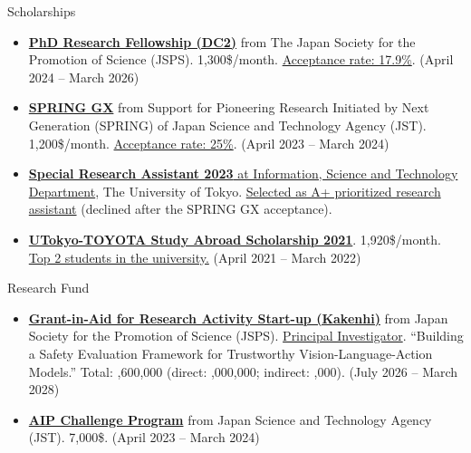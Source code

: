 \documentclass[]{mcdowellcv}
\begin{document}

\begin{cvsection}{Scholarships}
    \label{cvsec:scholorshop}
    \begin{cvsubsection}{}{}{}	
        \begin{itemize}
            \item \href{https://www.jsps.go.jp/english/e-pd/}{\textbf{PhD Research Fellowship (DC2)}} from The Japan Society for the Promotion of Science (JSPS). 1,300\$/month. \ul{Acceptance rate: 17.9\%}. (April 2024 -- March 2026)
            \item \href{https://www.cis-trans.jp/spring_gx/index-e.html}{\textbf{SPRING GX}} from Support for Pioneering Research Initiated by Next Generation (SPRING) of Japan Science and Technology Agency (JST). 1,200\$/month. \ul{Acceptance rate: 25\%}. (April 2023 -- March 2024)
            \item \href{https://www.i.u-tokyo.ac.jp/edu/financial-support/ist-ra/index_e.shtml}{\textbf{Special Research Assistant 2023} at Information, Science and Technology Department}, The University of Tokyo. \ul{Selected as A+ prioritized research assistant} (declined after the SPRING GX acceptance).
            \item \href{https://www.u-tokyo.ac.jp/adm/go-global/ja/scholarship-list-toyota.html}{\textbf{UTokyo-TOYOTA Study Abroad Scholarship 2021}}. 1,920\$/month. \ul{Top 2 students in the university.} (April 2021 -- March 2022)
        \end{itemize}
    \end{cvsubsection}
\end{cvsection}

\begin{cvsection}{Research Fund}
    \label{cvsec:scholorshop}
    \begin{cvsubsection}{}{}{}
        \begin{itemize}
            \item \href{https://kaken.nii.ac.jp/en/grant/KAKENHI-PROJECT-26K25580/}{\textbf{Grant-in-Aid for Research Activity Start-up (Kakenhi)}} from Japan Society for the Promotion of Science (JSPS). \ul{Principal Investigator}. ``Building a Safety Evaluation Framework for Trustworthy Vision-Language-Action Models.'' Total: ,600,000 (direct: ,000,000; indirect: ,000). (July 2026 -- March 2028)
            \item \href{https://www.jst.go.jp/kisoken/aip/en/program/wakate/index.html}{\textbf{AIP Challenge Program}} from Japan Science and Technology Agency (JST). 7,000\$. (April 2023 -- March 2024)
        \end{itemize}
    \end{cvsubsection}
\end{cvsection}
\end{document}
